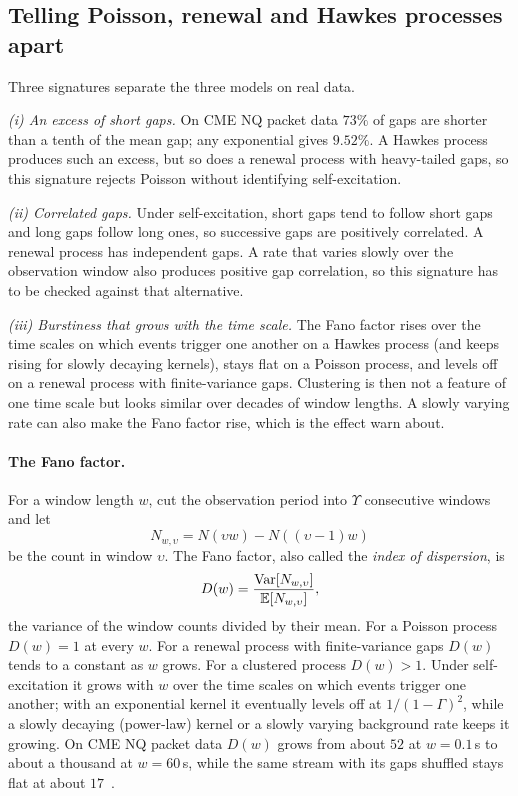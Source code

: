 \subsection{Telling Poisson, renewal and Hawkes processes apart}
\label{sec:pp-signatures}

Three signatures separate the three models on real data.

\emph{(i) An excess of short gaps.} On CME NQ packet data $73\%$ of gaps are shorter than a tenth of
the mean gap; any exponential gives $9.52\%$. A Hawkes process produces such an excess, but so does a
renewal process with heavy-tailed gaps, so this signature rejects Poisson without identifying
self-excitation.

\emph{(ii) Correlated gaps.} Under self-excitation, short gaps tend to follow short gaps and long
gaps follow long ones, so successive gaps are positively correlated. A renewal process has
independent gaps. A rate that varies slowly over the observation window also produces positive gap
correlation, so this signature has to be checked against that alternative.

\emph{(iii) Burstiness that grows with the time scale.} The Fano factor rises over the time scales on
which events trigger one another on a Hawkes process (and keeps rising for slowly decaying kernels), stays
flat on a Poisson process, and levels off on a renewal process with finite-variance gaps. Clustering is then not a feature
of one time scale but looks similar over decades of window lengths. A slowly varying rate can also
make the Fano factor rise, which is the effect \citet{filimonovsornette2015} warn about.

\paragraph{The Fano factor.}
\label{sec:pp-fano}
For a window length $w$, cut the observation period into $\Upsilon$ consecutive windows and let
\[
  N_{w,\upsilon} = N(\upsilon w) - N((\upsilon-1)w)
\]
be the count in window $\upsilon$. The Fano factor, also called the
\emph{index of dispersion}, is
\[
  D(w) = \frac{\mathrm{Var}[N_{w,\upsilon}]}{\mathbb{E}[N_{w,\upsilon}]},
\]
the variance of the window counts divided by their mean.
For a Poisson process $D(w) = 1$ at every
$w$. For a renewal process with finite-variance gaps $D(w)$ tends to a constant as $w$ grows. For a
clustered process $D(w) > 1$. Under self-excitation it grows with $w$ over the time scales on which
events trigger one another; with an exponential kernel it eventually levels off at $1/(1-\Gamma)^2$, while a
slowly decaying (power-law) kernel or a slowly varying background rate keeps it growing.
On CME NQ
packet data $D(w)$ grows from about $52$ at $w = 0.1$\,s to about a thousand at $w = 60$\,s, while
the same stream with its gaps shuffled stays flat at about $17$~\citep{maciejewski2026packets}.

